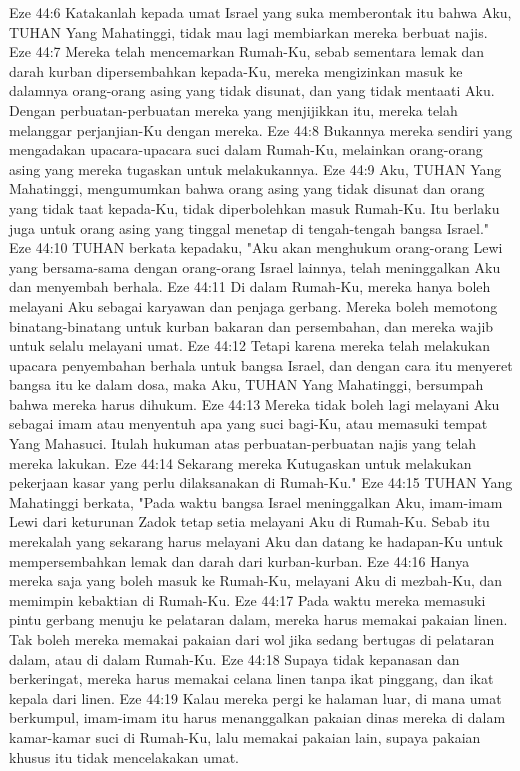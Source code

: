Eze 44:6  Katakanlah kepada umat Israel yang suka memberontak itu bahwa Aku, TUHAN Yang Mahatinggi, tidak mau lagi membiarkan mereka berbuat najis.
Eze 44:7  Mereka telah mencemarkan Rumah-Ku, sebab sementara lemak dan darah kurban dipersembahkan kepada-Ku, mereka mengizinkan masuk ke dalamnya orang-orang asing yang tidak disunat, dan yang tidak mentaati Aku. Dengan perbuatan-perbuatan mereka yang menjijikkan itu, mereka telah melanggar perjanjian-Ku dengan mereka.
Eze 44:8  Bukannya mereka sendiri yang mengadakan upacara-upacara suci dalam Rumah-Ku, melainkan orang-orang asing yang mereka tugaskan untuk melakukannya.
Eze 44:9  Aku, TUHAN Yang Mahatinggi, mengumumkan bahwa orang asing yang tidak disunat dan orang yang tidak taat kepada-Ku, tidak diperbolehkan masuk Rumah-Ku. Itu berlaku juga untuk orang asing yang tinggal menetap di tengah-tengah bangsa Israel."
Eze 44:10  TUHAN berkata kepadaku, "Aku akan menghukum orang-orang Lewi yang bersama-sama dengan orang-orang Israel lainnya, telah meninggalkan Aku dan menyembah berhala.
Eze 44:11  Di dalam Rumah-Ku, mereka hanya boleh melayani Aku sebagai karyawan dan penjaga gerbang. Mereka boleh memotong binatang-binatang untuk kurban bakaran dan persembahan, dan mereka wajib untuk selalu melayani umat.
Eze 44:12  Tetapi karena mereka telah melakukan upacara penyembahan berhala untuk bangsa Israel, dan dengan cara itu menyeret bangsa itu ke dalam dosa, maka Aku, TUHAN Yang Mahatinggi, bersumpah bahwa mereka harus dihukum.
Eze 44:13  Mereka tidak boleh lagi melayani Aku sebagai imam atau menyentuh apa yang suci bagi-Ku, atau memasuki tempat Yang Mahasuci. Itulah hukuman atas perbuatan-perbuatan najis yang telah mereka lakukan.
Eze 44:14  Sekarang mereka Kutugaskan untuk melakukan pekerjaan kasar yang perlu dilaksanakan di Rumah-Ku."
Eze 44:15  TUHAN Yang Mahatinggi berkata, "Pada waktu bangsa Israel meninggalkan Aku, imam-imam Lewi dari keturunan Zadok tetap setia melayani Aku di Rumah-Ku. Sebab itu merekalah yang sekarang harus melayani Aku dan datang ke hadapan-Ku untuk mempersembahkan lemak dan darah dari kurban-kurban.
Eze 44:16  Hanya mereka saja yang boleh masuk ke Rumah-Ku, melayani Aku di mezbah-Ku, dan memimpin kebaktian di Rumah-Ku.
Eze 44:17  Pada waktu mereka memasuki pintu gerbang menuju ke pelataran dalam, mereka harus memakai pakaian linen. Tak boleh mereka memakai pakaian dari wol jika sedang bertugas di pelataran dalam, atau di dalam Rumah-Ku.
Eze 44:18  Supaya tidak kepanasan dan berkeringat, mereka harus memakai celana linen tanpa ikat pinggang, dan ikat kepala dari linen.
Eze 44:19  Kalau mereka pergi ke halaman luar, di mana umat berkumpul, imam-imam itu harus menanggalkan pakaian dinas mereka di dalam kamar-kamar suci di Rumah-Ku, lalu memakai pakaian lain, supaya pakaian khusus itu tidak mencelakakan umat.
